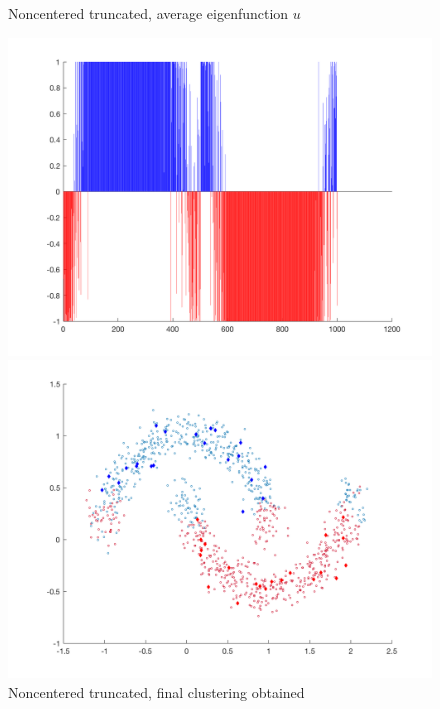 \documentclass{siamart1116}
\begin{document}
\begin{figure}[!htb]
\begin{minipage}{0.48\textwidth}
    \end{minipage}
\end{figure}
\begin{figure}[!htb]
    \begin{minipage}{0.48\textwidth}
        \centering
        \caption{\label{fig:moon_noncentered_truncated_avg} Noncentered truncated, average eigenfunction $u$}
        \includegraphics[width=\linewidth]{graphics/moons/noncentered_un_truncated/final_avg.png}
    \end{minipage} \hfill
    \begin{minipage}{0.48\textwidth}
        \centering
        \caption{\label{fig:moon_noncentered_truncated_scatter} Noncentered truncated, final clustering obtained}
        \includegraphics[width=\linewidth]{graphics/moons/noncentered_un_truncated/final_scatter.png}
    \end{minipage}
\end{figure}
\end{document}
